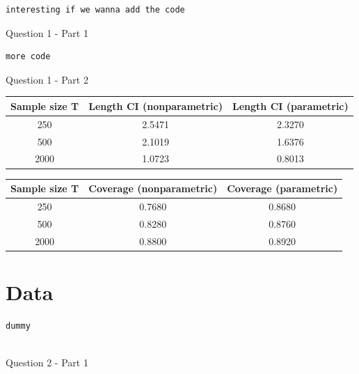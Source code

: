 \documentclass[12pt]{article}
\begin{document}
\begin{Program}[!htb]
\begin{lstlisting}[style=Matlab-editor,basicstyle=\mlttfamily\footnotesize]
interesting if we wanna add the code 
\end{lstlisting}
\caption{Question 1 - Part 1}
\label{Question 1 - Part 1}
\end{Program}

\begin{Program}[!htb]
\begin{lstlisting}[style=Matlab-editor,basicstyle=\mlttfamily\footnotesize]
more code 
\end{lstlisting}
\caption{Question 1 - Part 2}
\label{Question 1 - Part 2}
\end{Program}


\begin{center}
\begin{tabular}{||c | c c||} 
 \hline
 Sample size T & Length CI (nonparametric) & Length CI (parametric) \\ [0.5ex] 
 \hline\hline
 250 & 2.5471 & 2.3270 \\ 
 \hline
 500 & 2.1019 & 1.6376 \\
 \hline
 2000 & 1.0723 & 0.8013 \\ [1ex] 
 \hline
\end{tabular}
\end{center}
\vspace{3pt}
\begin{center}
\begin{tabular}{||c | c c||} 
 \hline
 Sample size T & Coverage (nonparametric) & Coverage (parametric) \\ [0.5ex] 
 \hline\hline
 250 & 0.7680 & 0.8680 \\ 
 \hline
 500 & 0.8280 & 0.8760 \\
 \hline
 2000 & 0.8800 & 0.8920 \\ [1ex] 
 \hline
\end{tabular}
\end{center}
\vspace{15pt}

\section{Data}

\begin{Program}[!htb]
\begin{lstlisting}[style=Matlab-editor,basicstyle=\mlttfamily\footnotesize]
dummy
  
\end{lstlisting}
\caption{Question 2 - Part 1}
\label{Question 2 - Part 1}
\end{Program}
\end{document}
